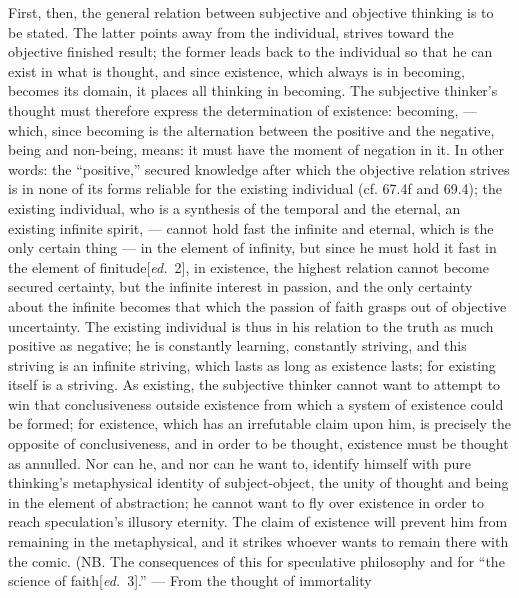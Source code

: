 \documentclass[12pt,a4paper,openany]{book}
\newcommand{\kpage}[1]{\marginnote{\footnotesize\textit{[#1]}}}
\newcommand{\ed}[1]{{\small[\textit{ed.}\ #1]}}
\begin{document}
\kpage{125}First, then, the general relation between subjective and objective
thinking is to be stated. The latter points away from the individual, strives
toward the objective finished result; the former leads back to the individual
so that he can exist in what is thought, and since existence, which always
is in becoming, becomes its domain, it places all thinking in becoming. The
subjective thinker's thought must therefore express the determination of existence:
becoming, --- which, since becoming is the alternation between
the positive and the negative, being and non-being, means: it
must have the moment of negation in it. In other words: the ``positive,''
secured knowledge after which the objective relation strives
is in none of its forms reliable for the existing individual (cf.
67.4f and 69.4); the existing individual, who is a synthesis of the temporal
and the eternal, an existing infinite spirit, --- cannot hold fast
the infinite and eternal, which is the only certain thing --- in the element of infinity,
but since he must hold it fast in the element of finitude\ed{2},
in existence, the highest relation cannot become secured
certainty, but the infinite interest in passion, and the only
certainty about the infinite becomes that which the passion of faith
grasps out of objective uncertainty. The existing individual is thus in his
relation to the truth as much positive as negative; he is constantly
learning, constantly striving, and this striving is an infinite
striving, which lasts as long as existence lasts; for existing itself
is a striving. As existing, the subjective thinker cannot
want to attempt to win that conclusiveness outside existence
from which a system of existence could be formed; for existence,
which has an irrefutable claim upon him, is precisely the
opposite of conclusiveness, and in order to be thought, existence must be thought
as annulled. Nor can he, and nor can he want to, identify
himself with pure thinking's metaphysical identity of subject-object,
the unity of thought and being in the element of abstraction;
he cannot want to fly over existence in order to reach speculation's
illusory eternity. The claim of existence will prevent him from remaining in
the metaphysical, and it strikes whoever wants to remain there with the
comic. (NB. The consequences of this for speculative philosophy
and for ``the science of faith\ed{3}.'' --- From the thought of immortality
\end{document}

